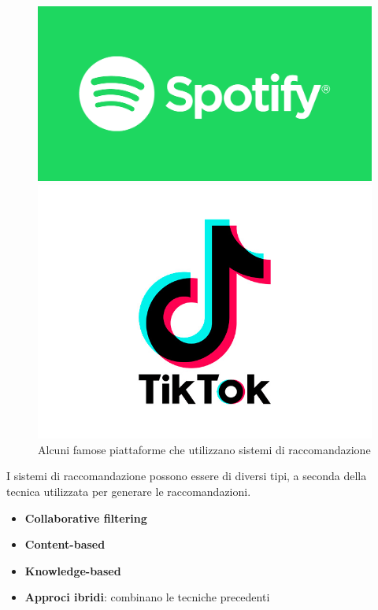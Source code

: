 \begin{figure}[h!]
\begin{minipage}{0.2\textwidth}
        \centering
        \includegraphics[width=\textwidth]{images/spotify.png}
    \end{minipage}\hfill
    \begin{minipage}{0.2\textwidth}
        \centering
        \includegraphics[width=\textwidth]{images/tiktok.png}
    \end{minipage}
    \caption{Alcuni famose piattaforme che utilizzano sistemi di raccomandazione}
\end{figure}


\noindent I sistemi di raccomandazione possono essere di diversi tipi, a seconda della tecnica utilizzata per generare le raccomandazioni.
\begin{itemize}
    \item \textbf{Collaborative filtering} \cite{CFRS}
    \item \textbf{Content-based} \cite{Lops2011}
    \item \textbf{Knowledge-based} \cite{KnowledgeBased}
    \item \textbf{Approci ibridi}: combinano le tecniche precedenti
\end{itemize}



